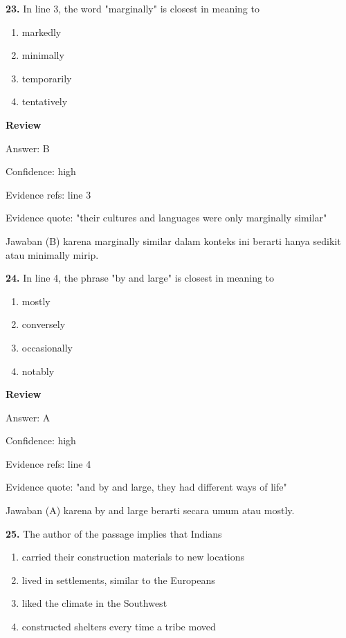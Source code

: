 \documentclass[12pt]{article}
\begin{document}
\endgroup
\par
\vspace{0.25\baselineskip}
\noindent\textbf{23.} In line 3, the word "marginally" is closest in meaning to
\begin{enumerate}[label=(\Alph*),leftmargin=*,itemsep=0.2em]
\item markedly
\item minimally
\item temporarily
\item tentatively
\end{enumerate}
\par
\begingroup
\setlength{\parskip}{0pt}
\setlength{\parindent}{0pt}
\textbf{Review}\par
Answer: B\par
Confidence: high\par
Evidence refs: line 3\par
Evidence quote: "their cultures and languages were only marginally similar"\par
Jawaban (B) karena marginally similar dalam konteks ini berarti hanya sedikit atau minimally mirip.\par
\endgroup
\par
\vspace{0.25\baselineskip}
\noindent\textbf{24.} In line 4, the phrase "by and large" is closest in meaning to
\begin{enumerate}[label=(\Alph*),leftmargin=*,itemsep=0.2em]
\item mostly
\item conversely
\item occasionally
\item notably
\end{enumerate}
\par
\begingroup
\setlength{\parskip}{0pt}
\setlength{\parindent}{0pt}
\textbf{Review}\par
Answer: A\par
Confidence: high\par
Evidence refs: line 4\par
Evidence quote: "and by and large, they had different ways of life"\par
Jawaban (A) karena by and large berarti secara umum atau mostly.\par
\endgroup
\par
\vspace{0.25\baselineskip}
\noindent\textbf{25.} The author of the passage implies that Indians
\begin{enumerate}[label=(\Alph*),leftmargin=*,itemsep=0.2em]
\item carried their construction materials to new locations
\item lived in settlements, similar to the Europeans
\item liked the climate in the Southwest
\item constructed shelters every time a tribe moved
\end{enumerate}
\end{document}

